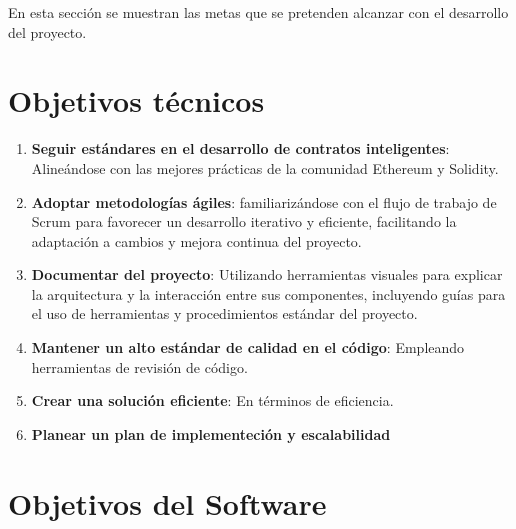 
En esta sección se muestran las metas que se pretenden alcanzar con el desarrollo del proyecto.

\section*{Objetivos técnicos}

\begin{enumerate}

\item \textbf{Seguir estándares en el desarrollo de contratos inteligentes}: Alineándose con las mejores prácticas de la comunidad Ethereum y Solidity. 

\item \textbf{Adoptar metodologías ágiles}: familiarizándose con el flujo de trabajo de Scrum para favorecer un desarrollo iterativo y eficiente, facilitando la adaptación a cambios y mejora continua del proyecto.

\item \textbf{Documentar del proyecto}: Utilizando herramientas visuales para explicar la arquitectura y la interacción entre sus componentes, incluyendo guías para el uso de herramientas y procedimientos estándar del proyecto.

\item \textbf{Mantener un alto estándar de calidad en el código}: Empleando herramientas de revisión de código.

\item \textbf{Crear una solución eficiente}: En términos de eficiencia.

\item \textbf{Planear un plan de implementeción y escalabilidad}

\end{enumerate}


\section*{Objetivos del Software}

